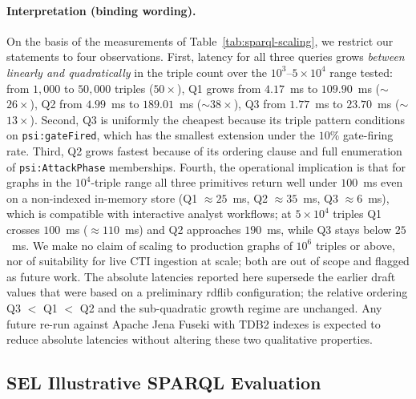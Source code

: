 \documentclass[futureinternet,article,submit,pdftex,moreauthors]{Definitions/mdpi}
\begin{document}
\paragraph{Interpretation (binding wording).} On the basis of the
measurements of Table~\ref{tab:sparql-scaling}, we restrict our
statements to four observations. First, latency for all three queries
grows \emph{between linearly and quadratically} in the triple count
over the $10^{3}$--$5\times 10^{4}$ range tested: from $1{,}000$ to
$50{,}000$ triples ($50\times$), Q1 grows from $4.17$~ms to
$109.90$~ms ($\sim$$26\times$), Q2 from $4.99$~ms to $189.01$~ms
($\sim$$38\times$), Q3 from $1.77$~ms to $23.70$~ms ($\sim$$13\times$).
Second, Q3 is uniformly the cheapest because its triple pattern
conditions on \texttt{psi:gateFired}, which has the smallest extension
under the $10\%$ gate-firing rate. Third, Q2 grows fastest because of
its ordering clause and full enumeration of \texttt{psi:AttackPhase}
memberships. Fourth, the operational implication is that for graphs in
the $10^{4}$-triple range all three primitives return well under
$100$~ms even on a non-indexed in-memory store (Q1 $\approx 25$~ms,
Q2 $\approx 35$~ms, Q3 $\approx 6$~ms), which is compatible with
interactive analyst workflows; at $5\times 10^{4}$ triples Q1 crosses
$100$~ms ($\approx 110$~ms) and Q2 approaches $190$~ms, while Q3 stays
below $25$~ms. We make no claim of scaling to production graphs of
$10^{6}$ triples or above, nor of suitability for live CTI ingestion at
scale; both are out of scope and flagged as future work. The absolute
latencies reported here supersede the earlier draft values that were
based on a preliminary rdflib configuration; the relative ordering Q3
$<$ Q1 $<$ Q2 and the sub-quadratic growth regime are unchanged.
Any future re-run against Apache Jena Fuseki with TDB2 indexes is
expected to reduce absolute latencies without altering these two
qualitative properties.

\subsection{SEL Illustrative SPARQL Evaluation}
\label{sec:eval-sel}
\end{document}
